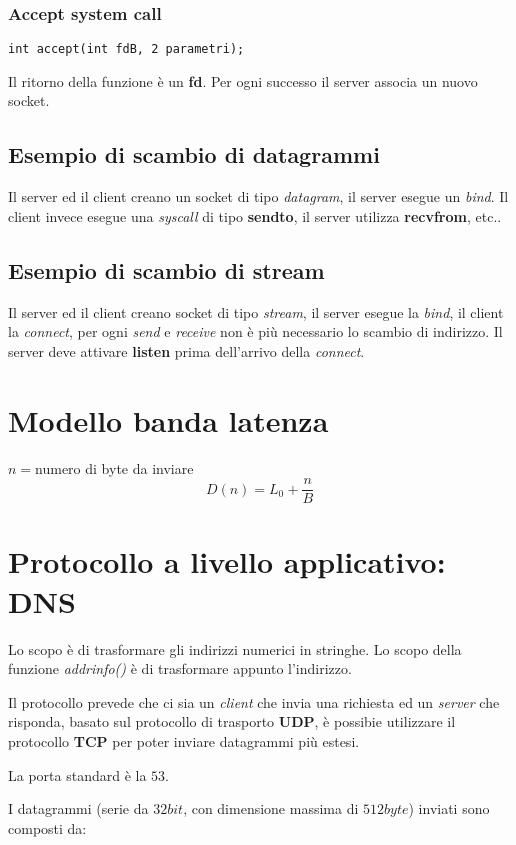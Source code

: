\subsubsection{Accept system call}
\begin{lstlisting}[caption=Esempio di syscall accept]
int accept(int fdB, 2 parametri);
\end{lstlisting}
Il ritorno della funzione è un \textbf{fd}.
Per ogni successo il server associa un nuovo socket.

\subsection{Esempio di scambio di datagrammi}
Il server ed il client creano un socket di tipo \emph{datagram}, il server
esegue un \emph{bind}.
Il client invece esegue una \emph{syscall} di tipo \textbf{sendto}, il server
utilizza \textbf{recvfrom}, etc..

\subsection{Esempio di scambio di stream}
Il server ed il client creano socket di tipo \emph{stream}, il server esegue
la \emph{bind}, il client la \emph{connect}, per ogni \emph{send} e
\emph{receive} non è più necessario lo scambio di indirizzo.
Il server deve attivare \textbf{listen} prima dell'arrivo della \emph{connect}.

\section{Modello banda latenza}
$n=$numero di byte da inviare
\[
  D(n)=L_0+\dfrac{n}{B}
\]

\section{Protocollo a livello applicativo: DNS}
Lo scopo è di trasformare gli indirizzi numerici in stringhe.
Lo scopo della funzione \emph{addrinfo()} è di trasformare appunto l'indirizzo.

Il protocollo prevede che ci sia un \emph{client} che invia una richiesta ed
un \emph{server} che risponda, basato sul protocollo di trasporto \textbf{UDP},
è possibie utilizzare il protocollo \textbf{TCP} per poter inviare datagrammi
più estesi.

La porta standard è la $53$.

I datagrammi (serie da $32bit$, con dimensione massima di $512byte$) inviati
sono composti da:

